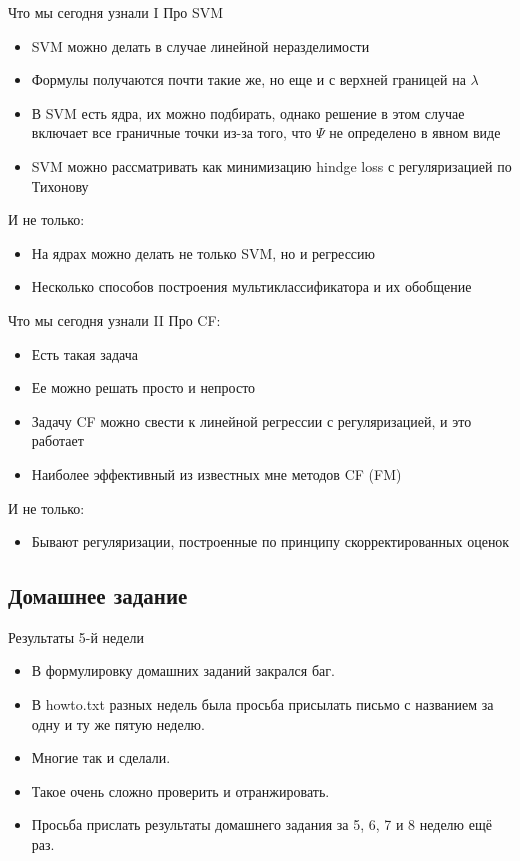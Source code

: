 \documentclass[14pt, fleqn, xcolor={dvipsnames, table}]{beamer}
\begin{document}
\begin{frame}{Что мы сегодня узнали I}
\small
Про SVM
\begin{itemize}
  \item SVM можно делать в случае линейной неразделимости
  \item Формулы получаются почти такие же, но еще и с верхней границей на $\lambda$
  \item В SVM есть ядра, их можно подбирать, однако решение в этом случае включает все граничные точки из-за того, что $\Psi$ не определено в явном виде
  \item SVM можно рассматривать как минимизацию hindge loss с регуляризацией по Тихонову
\end{itemize}
И не только:
\begin{itemize}
  \item На ядрах можно делать не только SVM, но и регрессию
  \item Несколько способов построения мультиклассификатора и их обобщение
\end{itemize}
\end{frame}

\begin{frame}{Что мы сегодня узнали II}
\small
Про CF:
\begin{itemize}
  \item Есть такая задача
  \item Ее можно решать просто и непросто
  \item Задачу CF можно свести к линейной регрессии с регуляризацией, и это работает
  \item Наиболее эффективный из известных мне методов CF (FM)
\end{itemize}
И не только:
\begin{itemize}
  \item Бывают регуляризации, построенные по принципу скорректированных оценок
\end{itemize}
\end{frame}

\subsection{Домашнее задание}
\begin{frame}{Результаты 5-й недели}
\begin{itemize}
  \item В формулировку домашних заданий закрался баг.
  \item В howto.txt разных недель была просьба присылать письмо с названием за одну и ту же пятую неделю.
  \item Многие так и сделали.
  \item Такое очень сложно проверить и отранжировать.
  \item Просьба прислать результаты домашнего задания за 5, 6, 7 и 8 неделю ещё раз. 
\end{itemize}
\end{frame}
\end{document}
